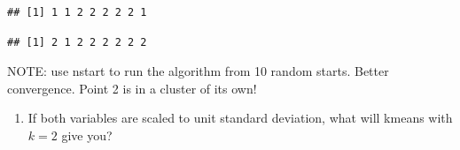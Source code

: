 \documentclass[]{article}
\newenvironment{Shaded}{\begin{snugshade}}{\end{snugshade}}
\newcommand{\DataTypeTok}[1]{\textcolor[rgb]{0.13,0.29,0.53}{#1}}
\newcommand{\DecValTok}[1]{\textcolor[rgb]{0.00,0.00,0.81}{#1}}
\newcommand{\FloatTok}[1]{\textcolor[rgb]{0.00,0.00,0.81}{#1}}
\newcommand{\KeywordTok}[1]{\textcolor[rgb]{0.13,0.29,0.53}{\textbf{#1}}}
\newcommand{\NormalTok}[1]{#1}
\newcommand{\OperatorTok}[1]{\textcolor[rgb]{0.81,0.36,0.00}{\textbf{#1}}}
\newcommand{\OtherTok}[1]{\textcolor[rgb]{0.56,0.35,0.01}{#1}}
\newcommand{\StringTok}[1]{\textcolor[rgb]{0.31,0.60,0.02}{#1}}
\providecommand{\tightlist}{%
  \setlength{\itemsep}{0pt}\setlength{\parskip}{0pt}}
\begin{document}
\begin{Shaded}
\end{Shaded}

\begin{verbatim}
## [1] 1 1 2 2 2 2 2 1
\end{verbatim}

\begin{Shaded}
\end{Shaded}

\begin{verbatim}
## [1] 2 1 2 2 2 2 2 2
\end{verbatim}

NOTE: use nstart to run the algorithm from 10 random starts. Better
convergence. Point 2 is in a cluster of its own!

\begin{enumerate}
\def\labelenumi{\alph{enumi})}
\setcounter{enumi}{1}
\tightlist
\item
  If both variables are scaled to unit standard deviation, what will
  kmeans with \(k = 2\) give you?
\end{enumerate}

\begin{Shaded}
\end{Shaded}
\end{document}
